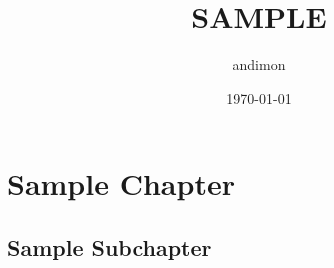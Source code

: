 \documentclass[12pt]{mystyle}
\author{andimon}
\title{SAMPLE}
\date{\today}
\begin{document}
\maketitle

\chapter{Sample Chapter}
\section{Sample Subchapter}
\end{document}
